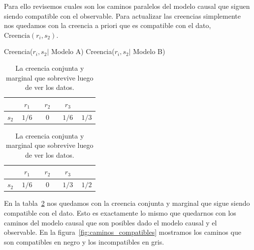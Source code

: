 \documentclass[a4paper,10pt]{book}
\theoremstyle{definition}
\begin{document}
Para ello revisemos cuales son los caminos paralelos del modelo causal que siguen siendo compatible con el observable.
Para actualizar las creencias simplemente nos quedamos con la creencia a priori que es compatible con el dato, $\text{Creencia}(r_i, s_2)$.
%
\begin{table}[ht!]
\centering
Creencia($r_i, s_2|$ Modelo A)  \hspace{2.5cm}  Creencia($r_i, s_2|$ Modelo B) \\[0.1cm]
 \begin{tabular}{|c|c|c|c||c|} \hline \setlength\tabcolsep{0.4cm}
       & \, $r_1$ \, &  \, $r_2$ \, & \, $r_3$ \, & \\ \hline 
  $s_2$ & $1/6$ & $0$ & $1/6$ & $1/3$ \\ \hline
  \end{tabular}
  \hspace{1.5cm}
  \begin{tabular}{|c|c|c|c||c|} \hline  \setlength\tabcolsep{0.4cm} 
 & \, $r_1$ \, &  \, $r_2$ \, & \, $r_3$ \, & \\ \hline 
  $s_2$ & $1/6$ & $0$ & $1/3$ & $1/2$ \\ \hline
  \end{tabular}
  \caption{La creencia conjunta y marginal que sobrevive luego de ver los datos. }
  \label{tab:creencia_compatible}
\end{table}

En la tabla~\ref{tab:creencia_compatible} nos quedamos con la creencia conjunta y marginal que sigue siendo compatible con el dato.
%
Esto es exactamente lo mismo que quedarnos con los caminos del modelo causal que son posibles dado el modelo causal y el observable.
%
En la figura~\ref{fig:caminos_compatibles} mostramos los caminos que son compatibles en negro y los incompatibles en gris.
\end{document}
